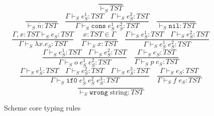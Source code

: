\begin{figure}[p]
\[
\frac{}{\vdash_{S}TST}
\]
\bigskip
\[
\frac{}{\vdash_{S}\overline{n}:TST}
\quad
\frac{\Gamma\vdash_{S}e_{S}^{1}:TST\quad\Gamma\vdash_{S}e_{S}^{2}:TST}{\Gamma\vdash_{S}\mathtt{cons}\;e_{S}^{1}\;e_{S}^{2}:TST}
\quad
\frac{}{\vdash_{S}\mathtt{nil}:TST}
\]
\[
\frac{\Gamma,x:TST\vdash_{S}e_{S}:TST}{\Gamma\vdash_{S}\lambda x.e_{S}:TST}
\quad
\frac{x:TST\in\Gamma}{\Gamma\vdash_{S}x:TST}
\quad
\frac{\Gamma\vdash_{S}e_{S}^{1}:TST\quad\Gamma\vdash_{S}e_{S}^{2}:TST}{\Gamma\vdash_{S}e_{S}^{1}\;e_{S}^{2}:TST}
\]
\[
\frac{\Gamma\vdash_{S}e_{S}^{1}:TST\quad\Gamma\vdash_{S}e_{S}^{2}:TST}{\Gamma\vdash_{S}o\;e_{S}^{1}\;e_{S}^{2}:TST}
\quad
\frac{\Gamma\vdash_{S}e_{S}:TST}{\Gamma\vdash_{S}p\;e_{S}:TST}
\]
\[
\frac{\Gamma\vdash_{S}e_{S}^{1}:TST\quad\Gamma\vdash_{S}e_{S}^{2}:TST\quad\Gamma\vdash_{S}e_{S}^{3}:TST}{\Gamma\vdash_{S}\mathtt{if0}\;e_{S}^{1}\;e_{S}^{2}\;e_{S}^{3}:TST}
\quad
\frac{\Gamma\vdash_{S}e_{S}:TST}{\Gamma\vdash_{S}f\;e_{S}:TST}
\]
\[
\frac{}{\vdash_{S}\mathtt{wrong}\;\mathrm{string}:TST}
\]
\caption{Scheme core typing rules}
\label{cstr}
\end{figure}